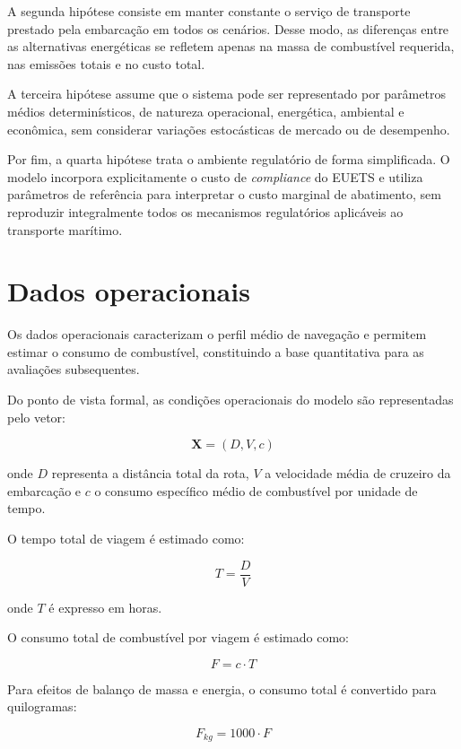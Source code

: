A segunda hipótese consiste em manter constante o serviço de transporte prestado pela embarcação em todos os cenários. Desse modo, as diferenças entre as alternativas energéticas se refletem apenas na massa de combustível requerida, nas emissões totais e no custo total.

A terceira hipótese assume que o sistema pode ser representado por parâmetros médios determinísticos, de natureza operacional, energética, ambiental e econômica, sem considerar variações estocásticas de mercado ou de desempenho.

Por fim, a quarta hipótese trata o ambiente regulatório de forma simplificada. O modelo incorpora explicitamente o custo de \emph{compliance} do \gls{EUETS} e utiliza parâmetros de referência para interpretar o custo marginal de abatimento, sem reproduzir integralmente todos os mecanismos regulatórios aplicáveis ao transporte marítimo.

\section{Dados operacionais}

Os dados operacionais caracterizam o perfil médio de navegação e permitem estimar o consumo de combustível, constituindo a base quantitativa para as avaliações subsequentes.

Do ponto de vista formal, as condições operacionais do modelo são representadas pelo vetor:

\[
\mathbf{X} = (D, V, c)
\]

onde $D$ representa a distância total da rota, $V$ a velocidade média de cruzeiro da embarcação e $c$ o consumo específico médio de combustível por unidade de tempo.

O tempo total de viagem é estimado como:

\begin{equation}
T = \frac{D}{V}
\end{equation}

onde $T$ é expresso em horas.

O consumo total de combustível por viagem é estimado como:

\begin{equation}
F = c \cdot T
\end{equation}

Para efeitos de balanço de massa e energia, o consumo total é convertido para quilogramas:

\[
F_{kg} = 1000 \cdot F
\]

